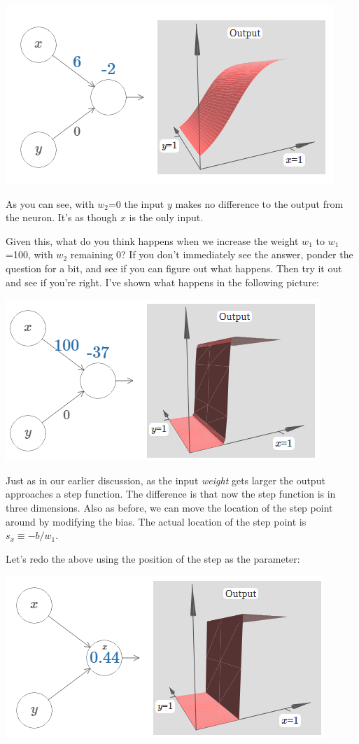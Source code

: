 {\centering \includegraphics[width=.6\textwidth,]{pic/wigglyfn22} \par}


As you can see, with $w_2$=0 the input $y$ makes no difference to the output from the neuron. It's as though $x$ is the only input.

Given this, what do you think happens when we increase the weight $w_1$
to $w_1$=100, with $w_2$ remaining 0? If you don't immediately see the answer, ponder the question for a bit, and see if you can figure out what happens. Then try it out and see if you're right. I've shown what happens in the following picture:

{\centering \includegraphics[width=.6\textwidth,]{pic/wigglyfn23} \par}

Just as in our earlier discussion, as the input \textit{weight} gets larger the output approaches a step function. The difference is that now the step function is in three dimensions. Also as before, we can move the location of the step point around by modifying the bias. The actual location of the step point is $s_x \equiv -b/w_1$.

Let's redo the above using the position of the step as the parameter:

{\centering \includegraphics[width=.6\textwidth,]{pic/wigglyfn24} \par}

